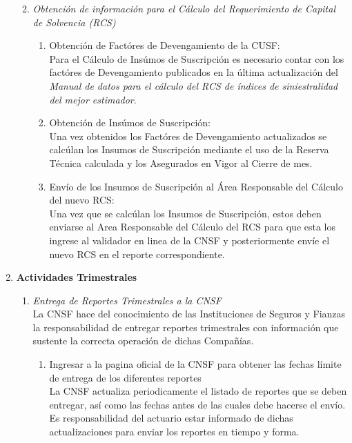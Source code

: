 \documentclass[11pt,twoside,openright,spanish]{report}
\numberwithin{equation}{chapter}
\numberwithin{figure}{chapter}
\numberwithin{table}{chapter}
\begin{document}
\begin{singlespace}
\begin{enumerate}
\begin{enumerate}
\begin{enumerate}
			\end{enumerate}
			\item \textit{Obtención de información para el Cálculo del Requerimiento de Capital de Solvencia (RCS)} 
				\begin{enumerate} 
					\item Obtención de Factóres de Devengamiento de la CUSF:\\ \-\hspace{0.5cm}
					Para el Cálculo de Insúmos de Suscripción es necesario contar con los factóres de Devengamiento publicados en la última actualización del \textit{Manual de datos para el cálculo del RCS de índices de siniestralidad del mejor estimador}.
					\item Obtención de Insúmos de Suscripción:\\ \-\hspace{0.5cm}
					Una vez obtenidos los Factóres de Devengamiento actualizados se calcúlan los Insumos de Suscripción mediante el uso de la Reserva Técnica calculada y los Asegurados en Vigor al Cierre de mes.
					\item Envío de los Insumos de Suscripción al Área Responsable del Cálculo del nuevo RCS:\\ \-\hspace{0.5cm} Una vez que se calcúlan los Insumos de Suscripción, estos deben enviarse al Area Responsable del Cálculo del RCS para que esta los ingrese al validador en linea de la CNSF y posteriormente envíe el nuevo RCS en el reporte correspondiente.\\ 
				\end{enumerate}
		\end{enumerate}
	\item \textbf{Actividades Trimestrales}
\begin{enumerate}
		\item \textit{Entrega de Reportes Trimestrales a la CNSF} \\ \-\hspace{0.5cm}
		La CNSF hace del conocimiento de las Instituciones de Seguros y Fianzas la responsabilidad de entregar reportes trimestrales con información que sustente la correcta operación de dichas Compañías.
		\begin{enumerate}
	\item {Ingresar a la pagina oficial de la CNSF para obtener las fechas límite de entrega de los diferentes reportes} \\ \-\hspace{0.5cm}
	La CNSF actualiza periodicamente el listado de reportes que se deben entregar, así como las fechas antes de las cuales debe hacerse el envío. Es responsabilidad del actuario estar informado de dichas actualizaciones para enviar los reportes en tiempo y forma.

\end{enumerate}
\end{enumerate}
\end{enumerate}
\end{singlespace}
\end{document}
